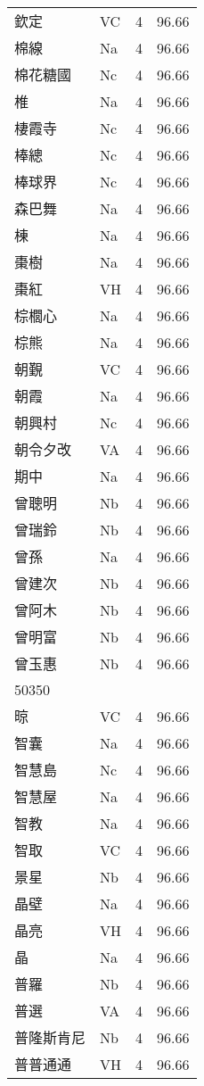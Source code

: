 \documentclass[twocolumn]{book}
\begin{document}
\begin{supertabular}{llrr}
欽定 & VC & 4 &  96.66\\
棉線 & Na & 4 &  96.66\\
棉花糖國 & Nc & 4 &  96.66\\
椎 & Na & 4 &  96.66\\
棲霞寺 & Nc & 4 &  96.66\\
棒總 & Nc & 4 &  96.66\\
棒球界 & Nc & 4 &  96.66\\
森巴舞 & Na & 4 &  96.66\\
棟 & Na & 4 &  96.66\\
棗樹 & Na & 4 &  96.66\\
棗紅 & VH & 4 &  96.66\\
棕櫚心 & Na & 4 &  96.66\\
棕熊 & Na & 4 &  96.66\\
朝覲 & VC & 4 &  96.66\\
朝霞 & Na & 4 &  96.66\\
朝興村 & Nc & 4 &  96.66\\
朝令夕改 & VA & 4 &  96.66\\
期中 & Na & 4 &  96.66\\
曾聰明 & Nb & 4 &  96.66\\
曾瑞鈴 & Nb & 4 &  96.66\\
曾孫 & Na & 4 &  96.66\\
曾建次 & Nb & 4 &  96.66\\
曾阿木 & Nb & 4 &  96.66\\
曾明富 & Nb & 4 &  96.66\\
曾玉惠 & Nb & 4 &  96.66\\
50350\\
晾 & VC & 4 &  96.66\\
智囊 & Na & 4 &  96.66\\
智慧島 & Nc & 4 &  96.66\\
智慧屋 & Na & 4 &  96.66\\
智教 & Na & 4 &  96.66\\
智取 & VC & 4 &  96.66\\
景星 & Nb & 4 &  96.66\\
晶壁 & Na & 4 &  96.66\\
晶亮 & VH & 4 &  96.66\\
晶 & Na & 4 &  96.66\\
普羅 & Nb & 4 &  96.66\\
普選 & VA & 4 &  96.66\\
普隆斯肯尼 & Nb & 4 &  96.66\\
普普通通 & VH & 4 &  96.66\\

\end{supertabular}
\end{document}
